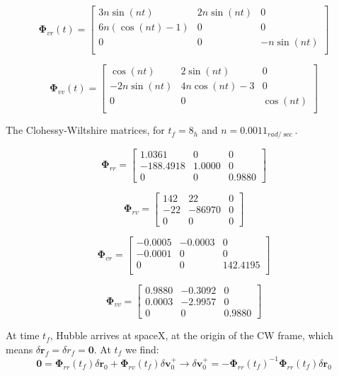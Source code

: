 $$
\boldsymbol \Phi_{vr}(t) = \begin{bmatrix}
    3n\sin(nt) & 2n\sin(nt) & 0\\
    6n(\cos(nt) -1) & 0 & 0\\
    0 & 0 & -n\sin(nt)\\
\end{bmatrix}
$$

$$
\boldsymbol \Phi_{vv}(t) = \begin{bmatrix}
    \cos(nt) & 2\sin(nt) & 0\\
    -2n\sin(nt) & 4n\cos(nt)-3 & 0\\
    0 & 0 & \cos(nt)\\
\end{bmatrix}
$$

The Clohessy-Wiltshire matrices, for $t_f = 8_h$ and $n = 0.0011_{rad/\sec}$.

$$
\boldsymbol \Phi_{rr} = 
\begin{bmatrix}
    1.0361     &    0   &      0\\
    -188.4918 &   1.0000     &    0\\
            0     &    0    &0.9880
\end{bmatrix}
$$


$$
\boldsymbol \Phi_{rv} = 
\begin{bmatrix}
    142  &  22      &   0 \\
    -22 &  -86970 &     0\\
          0    &     0 &  0
\end{bmatrix}
$$

$$
\boldsymbol \Phi_{vr} = 
\begin{bmatrix}
    -0.0005  & -0.0003   &      0\\
    -0.0001   &      0  &       0\\
          0    &     0 & 142.4195\\
\end{bmatrix}
$$

$$
\boldsymbol \Phi_{vv} = 
\begin{bmatrix}
    0.9880  & -0.3092   &      0\\
    0.0003  & -2.9957  &       0\\
         0   &      0 &   0.9880
\end{bmatrix}
$$

At time $t_f$, Hubble arrives at spaceX, at the origin of the CW frame, which means $\delta \boldsymbol r_f = \delta r_f = \boldsymbol 0$. At $t_f$ we find:
$$
\boldsymbol 0 = \boldsymbol \Phi_{rr}(t_f) \delta \boldsymbol r_0 + \boldsymbol \Phi_{rv}(t_f) \delta \boldsymbol v_0^+
\rightarrow \delta \boldsymbol v_0^+ = -\boldsymbol \Phi_{rr}(t_f)^{-1} \boldsymbol \Phi_{rr}(t_f) \delta \boldsymbol r_0
$$

